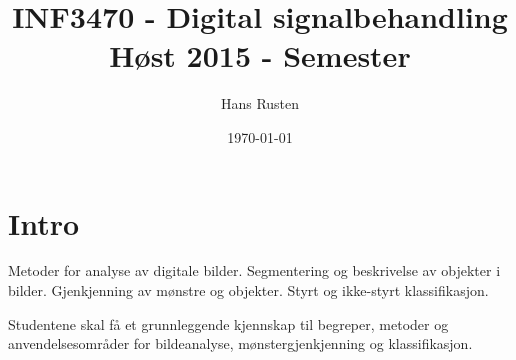 \documentclass[11pt]{article}
\begin{document}
\lstset{language=Java} 
\title{INF3470 - Digital signalbehandling \\ Høst 2015 - Semester}
\author{Hans Rusten}
\date{\today}
\maketitle


\section{Intro}
Metoder for analyse av digitale bilder. Segmentering og beskrivelse av objekter i bilder. Gjenkjenning av mønstre og objekter. Styrt og ikke-styrt klassifikasjon.

Studentene skal få et grunnleggende kjennskap til begreper, metoder og anvendelsesområder for bildeanalyse, mønstergjenkjenning og klassifikasjon.
\end{document}
